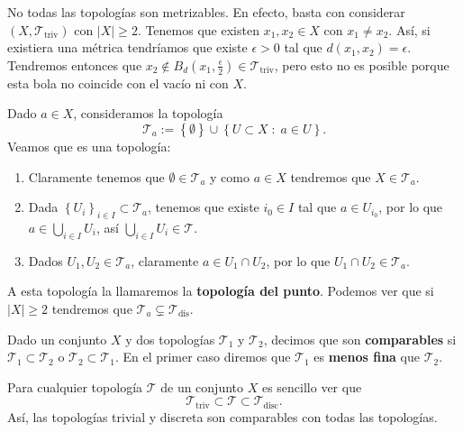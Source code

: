 \begin{observation}
No todas las topologías son metrizables. En efecto, basta con considerar $\displaystyle \left(X, \mathcal{T}_{\text{triv}}\right) $ con $\displaystyle \left|X\right|\geq 2 $. Tenemos que existen $\displaystyle x_{1}, x_{2} \in X $ con $\displaystyle x_{1}\neq x_{2} $. Así, si existiera una métrica tendríamos que existe $\displaystyle \epsilon > 0 $ tal que $\displaystyle d\left(x_{1}, x_{2}\right)=\epsilon  $. 
Tendremos entonces que $\displaystyle x_{2}\not\in B_{d}\left(x_{1}, \frac{\epsilon }{2}\right)\in \mathcal{T}_{\text{triv}} $, pero esto no es posible porque esta bola no coincide con el vacío ni con $\displaystyle X $.
\end{observation}
\begin{eg}
Dado $\displaystyle a \in X $, consideramos la topología
\[\mathcal{T}_{a}:= \left\{ \emptyset\right\} \cup \left\{ U \subset X \; : \; a \in U\right\}  .\]
Veamos que es una topología: 
\begin{enumerate}
\item Claramente tenemos que $\displaystyle \emptyset \in \mathcal{T}_{a} $ y como $\displaystyle a \in X $ tendremos que $\displaystyle X \in \mathcal{T}_{a} $. 
\item Dada $\displaystyle \left\{ U_{i}\right\} _{i \in I}\subset \mathcal{T}_{a} $, tenemos que existe $\displaystyle i_{0}\in I $ tal que $\displaystyle a \in U_{i_{0}} $, por lo que $\displaystyle a \in \bigcup_{i \in I}U_{i} $, así $\displaystyle \bigcup_{i\in I}U_{i} \in \mathcal{T} $.
\item Dados $\displaystyle U_{1}, U_{2} \in \mathcal{T}_{a} $, claramente $\displaystyle a \in U_{1} \cap U_{2} $, por lo que $\displaystyle U_{1} \cap U_{2} \in \mathcal{T}_{a} $.
\end{enumerate}
A esta topología la llamaremos la \textbf{topología del punto}. Podemos ver que si $\displaystyle \left|X\right|\geq 2 $ tendremos que $\displaystyle \mathcal{T}_{a}\subsetneq \mathcal{T}_{\text{dis}} $.
\end{eg}

\begin{definition}
Dado un conjunto $\displaystyle X $ y dos topologías $\displaystyle \mathcal{T}_{1} $ y $\displaystyle \mathcal{T}_{2} $, decimos que son \textbf{comparables} si $\displaystyle \mathcal{T}_{1}\subset\mathcal{T}_{2} $ o $\displaystyle \mathcal{T}_{2}\subset\mathcal{T}_{1} $. En el primer caso diremos que $\displaystyle \mathcal{T}_{1} $ es \textbf{menos fina} que $\displaystyle \mathcal{T}_{2} $.
\end{definition}
\begin{observation}
Para cualquier topología $\displaystyle \mathcal{T} $ de un conjunto $\displaystyle X $ es sencillo ver que 
\[\mathcal{T}_{\text{triv}}\subset \mathcal{T}\subset\mathcal{T}_{\text{disc}} .\]
Así, las topologías trivial y discreta son comparables con todas las topologías.
\end{observation}

